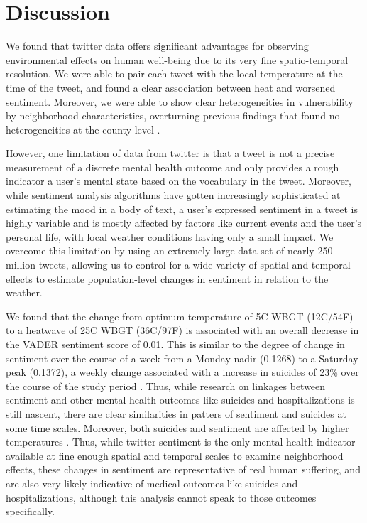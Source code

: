 \documentclass{article}
\begin{document}
\section{Discussion}
We found that twitter data offers significant advantages for observing environmental effects on human well-being due to its very fine spatio-temporal resolution.  We were able to pair each tweet with the local temperature at the time of the tweet, and found a clear association between heat and worsened sentiment.   Moreover, we were able to show clear heterogeneities in vulnerability by neighborhood characteristics, overturning previous findings that found no heterogeneities at the county level \cite{Burke2018Aug, Mullins2019Dec}.

However, one limitation of data from twitter is that a tweet is not a precise measurement of a discrete mental health outcome and only provides a rough indicator a user's mental state based on the vocabulary in the tweet.  Moreover, while sentiment analysis algorithms have gotten increasingly sophisticated at estimating the mood in a body of text, a user's expressed sentiment in a tweet is highly variable and is mostly affected by factors like current events and the user's personal life, with local weather conditions having only a small impact.  We overcome this limitation by using an extremely large data set of nearly 250 million tweets, allowing us to control for a wide variety of spatial and temporal effects to estimate population-level changes in sentiment in relation to the weather.

We found that the change from optimum temperature of 5\textdegree C WBGT (12\textdegree C/54\textdegree F) to a heatwave of 25\textdegree C WBGT (36\textdegree C/97\textdegree F) is associated with an overall decrease in the VADER sentiment score of 0.01.  This is similar to the degree of change in sentiment over the course of a week from a Monday nadir (0.1268) to a Saturday peak (0.1372), a weekly change associated with a increase in suicides of 23\% over the course of the study period \cite{CDC2021}.  Thus, while research on linkages between sentiment and other mental health outcomes like suicides and hospitalizations is still nascent, there are clear similarities in patters of sentiment and suicides at some time scales.  Moreover, both suicides and sentiment are affected by higher temperatures \cite{baylis_weather_2018, Burke2018Aug}.  Thus, while twitter sentiment is the only mental health indicator available at fine enough spatial and temporal scales to examine neighborhood effects, these changes in sentiment are representative of real human suffering, and are also very likely indicative of medical outcomes like suicides and hospitalizations, although this analysis cannot speak to those outcomes specifically.
\end{document}
